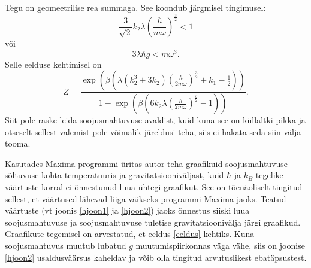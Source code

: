 \documentclass{trkut}%
\begin{document}
Tegu on geomeetrilise rea summaga. See koondub järgmisel tingimusel:
\begin{equation}
    \frac{3}{\sqrt{2}}k_2\lambda \left(\frac{\hbar}{m\omega}\right)^{\frac{3}{2}}<1
\end{equation}
või
\begin{equation} \label{eeldus}
    3 \lambda \hbar g < m \omega^3.
\end{equation}
Selle eelduse kehtimisel on
\begin{equation}
    Z=\frac{\exp\left( \beta \left(  \lambda (k_2^3+3k_2)\left(\frac{\hbar}{2m\omega}\right)^{\frac{3}{2}} +k_1 -\frac{1}{2}\right)\right)}{1-\exp \left( \beta\left( 6 k_2 \lambda \left( \frac{\hbar}{2m\omega}\right)^{\frac{3}{2}} - 1 \right)\right)}.
\end{equation}
Siit pole raske leida soojusmahtuvuse avaldist, kuid kuna see on küllaltki pikka ja otseselt sellest valemist pole võimalik järeldusi teha, siis ei hakata seda siin välja tooma.

Kasutades Maxima programmi üritas autor teha graafikuid soojusmahtuvuse sõltuvuse kohta temperatuuris ja gravitatsiooniväljast, kuid $\hbar$ ja $k_B$ tegelike väärtuste korral ei õnnestunud luua ühtegi graafikut.
See on tõenäoliselt tingitud sellest, et väärtused lähevad liiga väikseks programmi Maxima jaoks.
Teatud väärtuste (vt joonis \ref{hjoon1} ja \ref{hjoon2}) jaoks õnnestus siiski luua soojusmahtuvuse ja soojusmahtuvuse tuletise gravitatsioonivälja järgi graafikud.
Graafikute tegemisel on arvestatud, et eeldus \eqref{eeldus} kehtiks.
Kuna soojusmahtuvus muutub lubatud $g$ muutumispiirkonnas väga vähe, siis on joonise \ref{hjoon2} usaldusväärsus kaheldav ja võib olla tingitud arvutuslikest ebatäpsustest.
\end{document}

